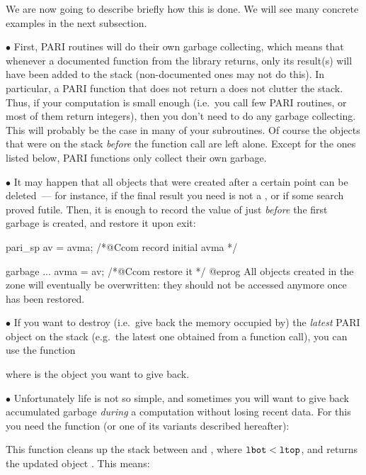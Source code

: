 We are now going to describe briefly how this is done. We will see many
concrete examples in the next subsection.

\noindent$\bullet$
First, PARI routines will do their own garbage collecting, which
means that whenever a documented function from the library returns, only its
result(s) will have been added to the stack (non-documented ones may not do
this). In particular, a PARI function that does not return
a  does not clutter the stack. Thus, if your computation is small
enough (i.e.~you call few PARI routines, or most of them return 
integers), then you don't need to do any garbage collecting. This will probably
be the case in many of your subroutines. Of course the objects that were on
the stack \emph{before} the function call are left alone. Except for the ones
listed below, PARI functions only collect their own garbage.

\noindent$\bullet$
It may happen that all objects that were created after a certain point can
be deleted~--- for instance, if the final result you need is not a
, or if some search proved futile. Then, it is enough to record
the value of  just \emph{before} the first garbage is created,
and restore it upon exit:

\bprog
pari_sp av = avma; /*@Ccom record initial avma */

garbage ...
avma = av; /*@Ccom restore it */
@eprog
\noindent All objects created in the  zone will eventually
be overwritten: they should not be accessed anymore once  has been
restored.

\noindent$\bullet$
If you want to destroy (i.e.~give back the memory occupied by) the
\emph{latest} PARI object on the stack (e.g.~the latest one obtained from a
function call), you can use the function%


\noindent where  is the object you want to give back.

\noindent$\bullet$
Unfortunately life is not so simple, and sometimes you will want
to give back accumulated garbage \emph{during} a computation without losing
recent data. For this you need the  function (or one of its
variants described hereafter):


\noindent
This function cleans up the stack between  and , where
${\tt lbot} < {\tt ltop}$, and returns the updated object . This means:

